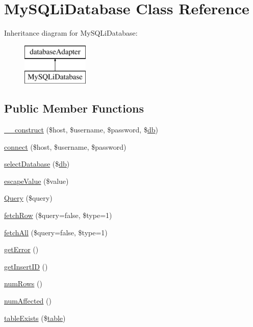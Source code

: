 \hypertarget{class_my_s_q_li_database}{
\section{MySQLiDatabase Class Reference}
\label{class_my_s_q_li_database}
}
Inheritance diagram for MySQLiDatabase:\begin{figure}[H]
\begin{center}
\leavevmode
\includegraphics[height=2.000000cm]{class_my_s_q_li_database}
\end{center}
\end{figure}
\subsection*{Public Member Functions}
\begin{DoxyCompactItemize}
\item 
\hyperlink{class_my_s_q_li_database_a81fcddb424f13e0862ee3f7e1ea57ce9}{\_\-\_\-construct} (\$host, \$username, \$password, \$\hyperlink{classdb}{db})
\item 
\hyperlink{class_my_s_q_li_database_a4c4f3316747e665b9e02f6ddcba4117c}{connect} (\$host, \$username, \$password)
\item 
\hyperlink{class_my_s_q_li_database_ab624b0b234f9db9dbc6dc4180f566b1f}{selectDatabase} (\$\hyperlink{classdb}{db})
\item 
\hyperlink{class_my_s_q_li_database_a039ae2e8f2bf579fd75d9df8df87eee3}{escapeValue} (\$value)
\item 
\hyperlink{class_my_s_q_li_database_aebc962126fd37fd3478c4689156d5f83}{Query} (\$query)
\item 
\hyperlink{class_my_s_q_li_database_acdee1c4e55c3792b3dbfeedfac35912f}{fetchRow} (\$query=false, \$type=1)
\item 
\hyperlink{class_my_s_q_li_database_a1750ab2493620de034b80a77577f3e8b}{fetchAll} (\$query=false, \$type=1)
\item 
\hyperlink{class_my_s_q_li_database_a24ada5decce3d1b79cd82f5a90ccf404}{getError} ()
\item 
\hyperlink{class_my_s_q_li_database_ac73f1d8cddbdfc35ca442189378a073c}{getInsertID} ()
\item 
\hyperlink{class_my_s_q_li_database_af37433a300db1f607ee789d22828a0a0}{numRows} ()
\item 
\hyperlink{class_my_s_q_li_database_acac8dfe61e7840f9a1e672ebede0be21}{numAffected} ()
\item 
\hyperlink{class_my_s_q_li_database_ae7cdaa744d52a1eb0103e377023ca528}{tableExists} (\$\hyperlink{classtable}{table})
\end{DoxyCompactItemize}

